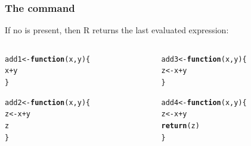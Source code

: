 \documentclass[12pt]{beamer}\usepackage[]{graphicx}\usepackage[]{color}
\makeatletter
\newcommand{\hlopt}[1]{\textcolor[rgb]{0,0,0}{#1}}%
\newcommand{\hlstd}[1]{\textcolor[rgb]{0.345,0.345,0.345}{#1}}%
\newcommand{\hlkwa}[1]{\textcolor[rgb]{0.161,0.373,0.58}{\textbf{#1}}}%
\newcommand{\hlkwb}[1]{\textcolor[rgb]{0.69,0.353,0.396}{#1}}%
\newcommand{\hlkwc}[1]{\textcolor[rgb]{0.333,0.667,0.333}{#1}}%
\newcommand{\hlkwd}[1]{\textcolor[rgb]{0.737,0.353,0.396}{\textbf{#1}}}%
\newenvironment{kframe}{%
 \def\at@end@of@kframe{}%
 \ifinner\ifhmode%
  \def\at@end@of@kframe{\end{minipage}}%
  \begin{minipage}{\columnwidth}%
 \fi\fi%
 \def\FrameCommand##1{\hskip\@totalleftmargin \hskip-\fboxsep
 \colorbox{shadecolor}{##1}\hskip-\fboxsep
     \hskip-\linewidth \hskip-\@totalleftmargin \hskip\columnwidth}%
 \MakeFramed {\advance\hsize-\width
   \@totalleftmargin\z@ \linewidth\hsize
   \@setminipage}}%
 {\par\unskip\endMakeFramed%
 \at@end@of@kframe}
\newenvironment{knitrout}{}{} %
\makeatother
\begin{document}
\begin{frame}[fragile]
\frametitle{The  command}

If no  is present, then R returns the last evaluated expression:

\begin{columns}[t]
\begin{column}{0.45\textwidth}
\begin{knitrout}\footnotesize
{}\color{fgcolor}\begin{kframe}
\begin{alltt}
\hlstd{add1} \hlkwb{<-} \hlkwa{function}\hlstd{(}\hlkwc{x}\hlstd{,} \hlkwc{y}\hlstd{) \{}
  \hlstd{x} \hlopt{+} \hlstd{y}
\hlstd{\}}

\hlstd{add2} \hlkwb{<-} \hlkwa{function}\hlstd{(}\hlkwc{x}\hlstd{,} \hlkwc{y}\hlstd{) \{}
  \hlstd{z} \hlkwb{<-} \hlstd{x} \hlopt{+} \hlstd{y}
  \hlstd{z}
\hlstd{\}}
\end{alltt}
\end{kframe}
\end{knitrout}
\end{column}

\begin{column}{0.45\textwidth}
\begin{knitrout}\footnotesize
{}\color{fgcolor}\begin{kframe}
\begin{alltt}
\hlstd{add3} \hlkwb{<-} \hlkwa{function}\hlstd{(}\hlkwc{x}\hlstd{,} \hlkwc{y}\hlstd{) \{}
  \hlstd{z} \hlkwb{<-} \hlstd{x} \hlopt{+} \hlstd{y}
\hlstd{\}}

\hlstd{add4} \hlkwb{<-} \hlkwa{function}\hlstd{(}\hlkwc{x}\hlstd{,} \hlkwc{y}\hlstd{) \{}
  \hlstd{z} \hlkwb{<-} \hlstd{x} \hlopt{+} \hlstd{y}
  \hlkwd{return}\hlstd{(z)}
\hlstd{\}}
\end{alltt}
\end{kframe}
\end{knitrout}
\end{column}
\end{columns}

\end{frame}

\end{document}
